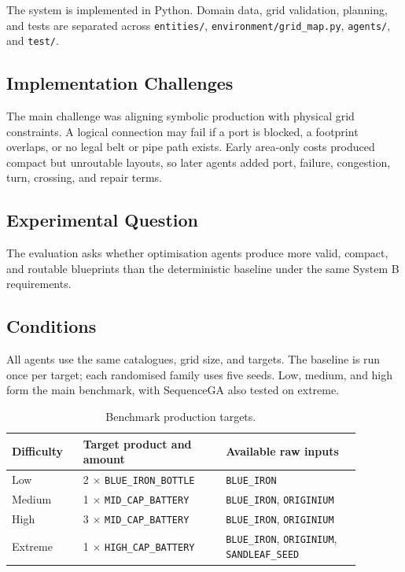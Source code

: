\documentclass[11pt,a4paper]{article}
\begin{document}
The system is implemented in Python. Domain data, grid validation, planning, and tests are separated across \texttt{entities/}, \texttt{environment/grid\_map.py}, \texttt{agents/}, and \texttt{test/}.

\subsection{Implementation Challenges}

The main challenge was aligning symbolic production with physical grid constraints. A logical connection may fail if a port is blocked, a footprint overlaps, or no legal belt or pipe path exists. Early area-only costs produced compact but unroutable layouts, so later agents added port, failure, congestion, turn, crossing, and repair terms.

\subsection{Experimental Question}

The evaluation asks whether optimisation agents produce more valid, compact, and routable blueprints than the deterministic baseline under the same System B requirements.

\subsection{Conditions}

All agents use the same catalogues, grid size, and targets. The baseline is run once per target; each randomised family uses five seeds. Low, medium, and high form the main benchmark, with SequenceGA also tested on extreme.


\begin{table}[H]
    \centering
    \caption{Benchmark production targets.}
    \label{tab:benchmark-targets}
    \begin{tabular}{L{0.18\linewidth} L{0.36\linewidth} L{0.34\linewidth}}
        \toprule
        Difficulty & Target product and amount & Available raw inputs \\
        \midrule
        Low & 2 $\times$ \texttt{BLUE\_IRON\_BOTTLE} & \texttt{BLUE\_IRON} \\
        Medium & 1 $\times$ \texttt{MID\_CAP\_BATTERY} & \texttt{BLUE\_IRON}, \texttt{ORIGINIUM} \\
        High & 3 $\times$ \texttt{MID\_CAP\_BATTERY} & \texttt{BLUE\_IRON}, \texttt{ORIGINIUM} \\
        Extreme & 1 $\times$ \texttt{HIGH\_CAP\_BATTERY} & \texttt{BLUE\_IRON}, \texttt{ORIGINIUM}, \texttt{SANDLEAF\_SEED} \\
        \bottomrule
    \end{tabular}
\end{table}
\end{document}
